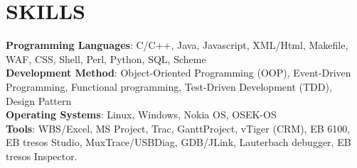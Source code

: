 
\section{SKILLS}
\textbf{Programming Languages}: C/C++, Java, Javascript, XML/Html, Makefile, WAF, CSS, Shell, Perl, Python, SQL, Scheme\\
\textbf{Development Method}:
Object-Oriented Programming (OOP),
Event-Driven Programming,
Functional programming,
Test-Driven Development (TDD),
Design Pattern\\
\textbf{Operating Systems}: Linux, Windows, Nokia OS, OSEK-OS\\
\textbf{Tools}: WBS/Excel, MS Project, Trac, GanttProject, vTiger (CRM),
EB 6100, EB tresos Studio, MuxTrace/USBDiag, GDB/JLink, Lauterbach debugger, EB tresos Inspector. \\


